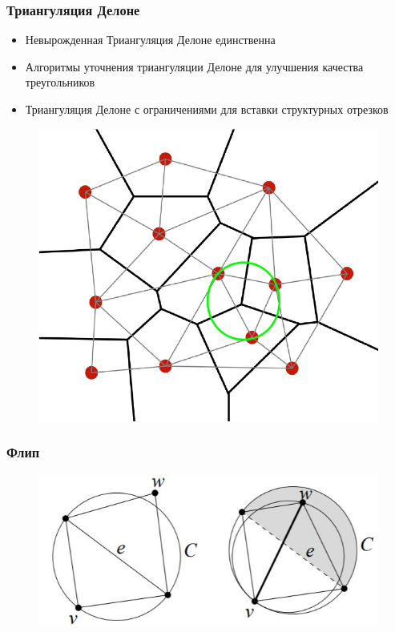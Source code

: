 \documentclass[10pt, unicode]{beamer}
\begin{document}
    \begin{frame}
        \frametitle{Триангуляция Делоне}
        \begin{itemize}
            \item Невырожденная Триангуляция Делоне единственна
            \item Алгоритмы уточнения триангуляции Делоне для улучшения качества треугольников
            \item Триангуляция Делоне с ограничениями для вставки структурных отрезков
        \end{itemize}
        \begin{figure}
            \centering
            \includegraphics[scale=0.25]{DelaunayAndVoronoi.png}
        \end{figure}
    \end{frame}
    \begin{frame}
        \frametitle{Флип}
        \begin{figure}[H]
            \centering
            \includegraphics[width=\linewidth, keepaspectratio]{FlipLemma.jpg}
        \end{figure}
    \end{frame}
\end{document}

